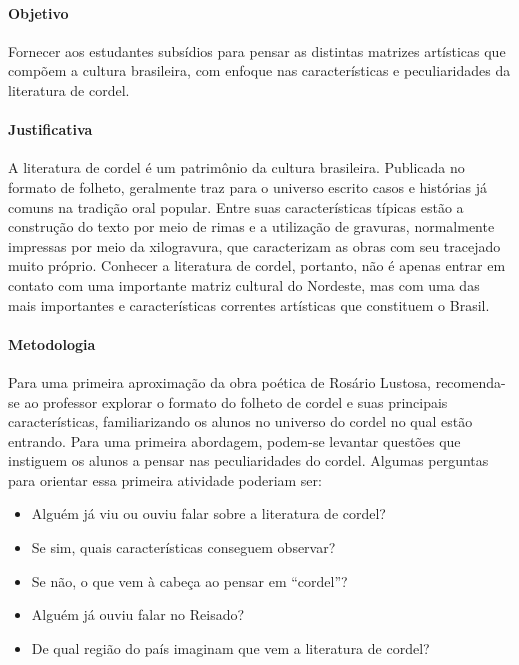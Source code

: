\documentclass[11pt]{extarticle}
\begin{document}
\paragraph{Objetivo} Fornecer aos estudantes subsídios para pensar as distintas matrizes artísticas que compõem a cultura brasileira, com enfoque nas características e peculiaridades da literatura de cordel.

\paragraph{Justificativa} A literatura de cordel é um patrimônio da cultura brasileira. Publicada no formato de folheto, geralmente traz para o universo escrito casos e histórias já comuns na tradição oral popular. Entre suas características típicas estão a construção do texto por meio de rimas e a utilização de gravuras, normalmente impressas por meio da xilogravura, que caracterizam as obras com seu tracejado muito próprio. Conhecer a literatura de cordel, portanto, não é apenas entrar em contato com uma importante matriz cultural do Nordeste, mas com uma das mais importantes e características correntes artísticas que constituem o Brasil.

\paragraph{Metodologia} Para uma primeira aproximação da obra poética de Rosário Lustosa, recomenda-se ao professor explorar o formato do folheto de cordel e suas principais características, familiarizando os alunos no universo do cordel no qual estão entrando. 
Para uma primeira abordagem, podem-se levantar questões que instiguem os alunos a pensar nas peculiaridades do cordel.
Algumas perguntas para orientar essa primeira atividade poderiam ser:

\begin{itemize}
\item Alguém já viu ou ouviu falar sobre a literatura de cordel?

\item Se sim, quais características conseguem observar?

\item Se não, o que vem à cabeça ao pensar em ``cordel''?

\item Alguém já ouviu falar no Reisado?

\item De qual região do país imaginam que vem a literatura de cordel?
\end{itemize}
\end{document}
